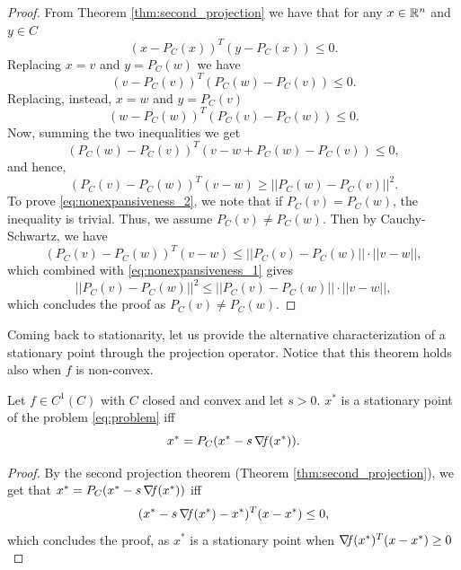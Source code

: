 \documentclass[10pt,a4paper]{article}
\begin{document}
\begin{proof}
	From Theorem \ref{thm:second_projection} we have that for any $x \in \mathbb{R}^n$ and $y\in C$
	\begin{equation*}
		(x-P_C(x))^T(y-P_C(x)) \leq 0.
	\end{equation*}
Replacing $x=v$ and $y=P_C(w)$ we have
\begin{equation*}
	(v-P_C(v))^T(P_C(w)-P_C(v)) \leq 0.
\end{equation*}
Replacing, instead, $x=w$ and $y=P_C(v)$
\begin{equation*}
	(w-P_C(w))^T(P_C(v)-P_C(w)) \leq 0.
\end{equation*}
Now, summing the two inequalities we get
\begin{equation*}
	(P_C(w)-P_C(v))^T(v-w+P_C(w)-P_C(v)) \leq 0,
\end{equation*}
and hence, 
\begin{equation*}
	(P_C(v)-P_C(w))^T(v-w) \geq ||P_C(w)-P_C(v)||^2.
\end{equation*}
To prove \eqref{eq:nonexpansiveness_2}, we note that if $P_C(v) = P_C(w)$, the inequality is trivial. Thus, we assume $P_C(v) \neq P_C(w)$. Then by Cauchy-Schwartz, we have 
\begin{equation*}
	(P_C(v)-P_C(w))^T(v-w) \leq ||P_C(v)-P_C(w)|| \cdot||v-w||,
\end{equation*}
which combined with \eqref{eq:nonexpansiveness_1} gives 
\begin{equation*}
	||P_C(v)-P_C(w)||^2 \leq ||P_C(v)-P_C(w)|| \cdot||v-w||,
\end{equation*}
which concludes the proof as $P_C(v) \neq P_C(w)$.
\end{proof}
Coming back to stationarity, let us provide the alternative characterization of a stationary point through the projection operator. Notice that this theorem holds also when $f$ is non-convex. 
\begin{theorem}\label{thm:stationarity_projection}
	Let $f\in C^1(C)$ with $C$ closed and convex and let $s>0$. $x^*$ is a stationary point of the problem \eqref{eq:problem} iff 
	\begin{equation}\label{eq:stationary_projection}
		x^*=P_C(x^*-s\operatorname*{\mathit{\nabla \!f}}(x^*)).
	\end{equation}
\end{theorem}
\begin{proof}
	By the second projection theorem (Theorem \ref{thm:second_projection}), we get that $x^*=P_C(x^*-s\operatorname*{\mathit{\nabla \!f}}(x^*))$ iff
	\begin{equation*}
		(x^*-s\operatorname*{\mathit{\nabla \!f}}(x^*) -x^*)^T(x-x^*)\leq 0, 
	\end{equation*}
which concludes the proof, as $x^*$ is a stationary point when $\operatorname*{\mathit{\nabla \!f}}(x^*)^T(x-x^*)\geq0$
\end{proof}
\end{document}
